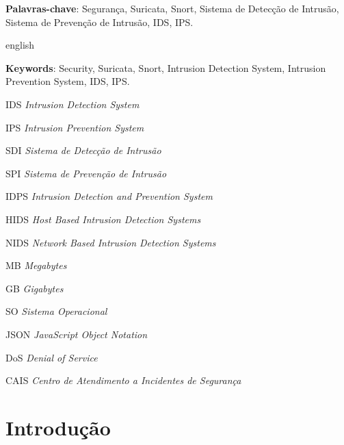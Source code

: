 \documentclass[
	12pt,				
	openright,		
	twoside,	
	a4paper,
	english,	
	brazil	
	]{abntex2}
\begin{document}
\setlength{\absparsep}{18pt} 
\begin{resumo}
 \textbf{Palavras-chave}: Segurança, Suricata, Snort, Sistema de Detecção de Intrusão, Sistema de Prevenção de Intrusão, IDS, IPS.
\end{resumo}
\begin{resumo}[Abstract]
 \begin{otherlanguage*}{english}
   \vspace{\onelineskip}
 
   \noindent 
   \textbf{Keywords}: Security, Suricata, Snort, Intrusion Detection System, Intrusion Prevention System, IDS, IPS.
 \end{otherlanguage*}
\end{resumo}
\listoffigures*
\cleardoublepage
{}
\listoftables*
\cleardoublepage
\begin{siglas}
  \item[IDS] \textit{Intrusion Detection System}
  \item[IPS] \textit{Intrusion Prevention System}
  \item[SDI] \textit{Sistema de Detecção de Intrusão}
  \item[SPI] \textit{Sistema de Prevenção de Intrusão}
  \item[IDPS] \textit{Intrusion Detection and Prevention System}
  \item[HIDS] \textit{Host Based Intrusion Detection Systems}
  \item[NIDS] \textit{Network Based Intrusion Detection Systems}
  \item[MB] \textit{Megabytes}
  \item[GB] \textit{Gigabytes}
  \item[SO] \textit{Sistema Operacional}
  \item[JSON] \textit{JavaScript Object Notation}
  \item[DoS] \textit{Denial of Service}
  \item[CAIS] \textit{Centro de Atendimento a Incidentes de Segurança}
\end{siglas}
\tableofcontents*
\cleardoublepage
\textual
\chapter{Introdução} \label{ch:introdução}
\end{document}
